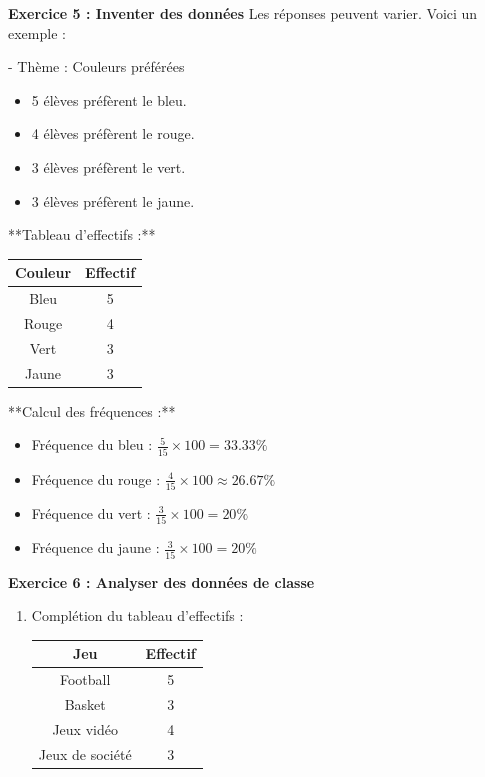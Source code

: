 \documentclass{article}
\begin{document}
\begin{tcolorbox}[colback=green!10!white, colframe=green!75!black, title=\textcolor{white}{Exercices}]

\textbf{Exercice 5 : Inventer des données}
Les réponses peuvent varier. Voici un exemple :

- Thème : Couleurs préférées
\begin{itemize}
    \item 5 élèves préfèrent le bleu.
    \item 4 élèves préfèrent le rouge.
    \item 3 élèves préfèrent le vert.
    \item 3 élèves préfèrent le jaune.
\end{itemize}

**Tableau d'effectifs :**
\begin{center}
\begin{tabular}{|c|c|}
\hline
Couleur & Effectif \\
\hline
Bleu & 5 \\
Rouge & 4 \\
Vert & 3 \\
Jaune & 3 \\
\hline
\end{tabular}
\end{center}

**Calcul des fréquences :**
\begin{itemize}
    \item Fréquence du bleu : \( \frac{5}{15} \times 100 = 33.33\% \)
    \item Fréquence du rouge : \( \frac{4}{15} \times 100 \approx 26.67\% \)
    \item Fréquence du vert : \( \frac{3}{15} \times 100 = 20\% \)
    \item Fréquence du jaune : \( \frac{3}{15} \times 100 = 20\% \)
\end{itemize}

\vspace{0.5cm}

\textbf{Exercice 6 : Analyser des données de classe}
\begin{enumerate}
    \item Complétion du tableau d'effectifs :
    
    \begin{center}
    \begin{tabular}{|c|c|}
    \hline
    Jeu & Effectif \\
    \hline
    Football & 5 \\
    Basket & 3 \\
    Jeux vidéo & 4 \\
    Jeux de société & 3 \\
    \hline
    \end{tabular}
    \end{center}


\end{enumerate}
\end{tcolorbox}
\end{document}
